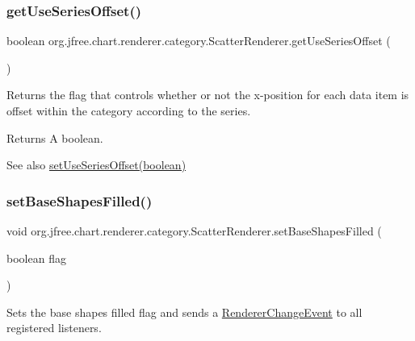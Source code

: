 \subsubsection{\texorpdfstring{get\+Use\+Series\+Offset()}{getUseSeriesOffset()}}
{\footnotesize\ttfamily boolean org.\+jfree.\+chart.\+renderer.\+category.\+Scatter\+Renderer.\+get\+Use\+Series\+Offset (\begin{DoxyParamCaption}{ }\end{DoxyParamCaption})}

Returns the flag that controls whether or not the x-\/position for each data item is offset within the category according to the series.

\begin{DoxyReturn}{Returns}
A boolean.
\end{DoxyReturn}
\begin{DoxySeeAlso}{See also}
\mbox{\hyperlink{classorg_1_1jfree_1_1chart_1_1renderer_1_1category_1_1_scatter_renderer_a0a2e10126057a8828d7c9e86270f2fbb}{set\+Use\+Series\+Offset(boolean)}} 
\end{DoxySeeAlso}
\mbox{\label{classorg_1_1jfree_1_1chart_1_1renderer_1_1category_1_1_scatter_renderer_a14df9e86f4dba956f2f438efe565ba6e}} 
\subsubsection{\texorpdfstring{set\+Base\+Shapes\+Filled()}{setBaseShapesFilled()}}
{\footnotesize\ttfamily void org.\+jfree.\+chart.\+renderer.\+category.\+Scatter\+Renderer.\+set\+Base\+Shapes\+Filled (\begin{DoxyParamCaption}\item[{boolean}]{flag }\end{DoxyParamCaption})}

Sets the base \textquotesingle{}shapes filled\textquotesingle{} flag and sends a \mbox{\hyperlink{}{Renderer\+Change\+Event}} to all registered listeners.


